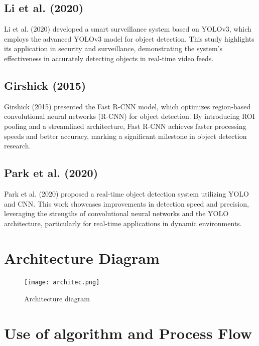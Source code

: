 \documentclass[openany,12pt]{report}
\begin{document}
\section{Li et al. (2020)}
Li et al. (2020) developed a smart surveillance system based on YOLOv3, which employs the advanced YOLOv3 model for object detection. This study highlights its application in security and surveillance, demonstrating the system's effectiveness in accurately detecting objects in real-time video feeds. 

\section{Girshick (2015)}
Girshick (2015) presented the Fast R-CNN model, which optimizes region-based convolutional neural networks (R-CNN) for object detection. By introducing ROI pooling and a streamlined architecture, Fast R-CNN achieves faster processing speeds and better accuracy, marking a significant milestone in object detection research.

\section{Park et al. (2020)}
Park et al. (2020) proposed a real-time object detection system utilizing YOLO and CNN. This work showcases improvements in detection speed and precision, leveraging the strengths of convolutional neural networks and the YOLO architecture, particularly for real-time applications in dynamic environments. 


\chapter{Architecture Diagram} %

\begin{figure}[h] %
    \centering %
    \texttt{[image: architec.png]} %
    \caption{Architecture diagram} %
    \label{fig:block_diagram} %
\end{figure}


\chapter{Use of algorithm and Process Flow}
\end{document}
